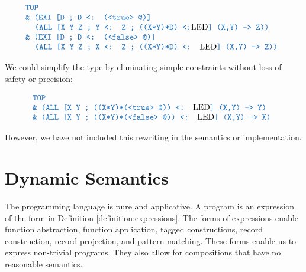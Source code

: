 \documentclass[acmsmall]{acmart}
\theoremstyle{definition}
\begin{document}
\[
  \begin{array}[t]{@{} l}
    \obj{TOP}
    \\
    \obj{\& (EXI [D ; D <: (<true> @)]}
    \\
    \I \obj{(ALL [X Y Z ; Y <: Z ; ((X*Y)*D) <:}\text{LED}\obj{] (X,Y) -> Z))}
    \\
    \obj{\& (EXI [D ; D <: (<false> @)]}
    \\
    \I \obj{(ALL [X Y Z ; X <: Z ; ((X*Y)*D) <: }\text{LED}\obj{] (X,Y) -> Z))}
  \end{array}
\]

We could simplify the type by eliminating simple constraints without loss of safety or precision:

\[
  \begin{array}[t]{@{} l}
    \obj{TOP}
    \\
    \obj{\& (ALL [X Y ; ((X*Y)*(<true> @)) <: }\text{LED}\obj{] (X,Y) -> Y)}
    \\
    \obj{\& (ALL [X Y ; ((X*Y)*(<false> @)) <: }\text{LED}\obj{] (X,Y) -> X)}
  \end{array}
\]

However, we have not included this rewriting in the semantics or implementation. 





\section{Dynamic Semantics}
The programming language is pure and applicative. A program is an expression 
of the form in Definition \ref{definition:expressions}. The forms of expressions
enable function abstraction, function application, tagged constructions, record construction, record projection,
and pattern matching. These forms enable us to express non-trivial programs. They also allow
for compositions that have no reasonable semantics.  
\end{document}
